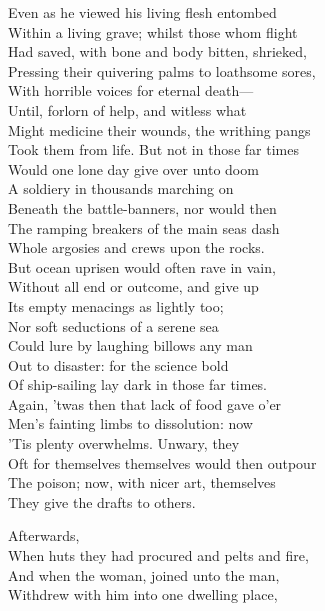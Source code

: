 Even as he viewed his living flesh entombed\\
Within a living grave; whilst those whom flight\\
Had saved, with bone and body bitten, shrieked,\\
Pressing their quivering palms to loathsome sores,\\
With horrible voices for eternal death—\\
Until, forlorn of help, and witless what\\
Might medicine their wounds, the writhing pangs\\
Took them from life. But not in those far times\\
Would one lone day give over unto doom\\
A soldiery in thousands marching on\\
Beneath the battle-banners, nor would then\\
The ramping breakers of the main seas dash\\
Whole argosies and crews upon the rocks.\\
But ocean uprisen would often rave in vain,\\
Without all end or outcome, and give up\\
Its empty menacings as lightly too;\\
Nor soft seductions of a serene sea\\
Could lure by laughing billows any man\\
Out to disaster: for the science bold\\
Of ship-sailing lay dark in those far times.\\
Again, 'twas then that lack of food gave o'er\\
Men's fainting limbs to dissolution: now\\
'Tis plenty overwhelms. Unwary, they\\
Oft for themselves themselves would then outpour\\
The poison; now, with nicer art, themselves\\
They give the drafts to others.


Afterwards,\\
When huts they had procured and pelts and fire,\\
And when the woman, joined unto the man,\\
Withdrew with him into one dwelling place,

